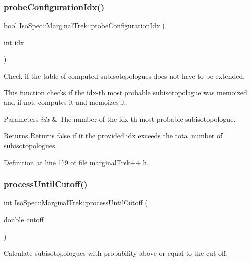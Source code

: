 \subsubsection{\texorpdfstring{probe\+Configuration\+Idx()}{probeConfigurationIdx()}}
{\footnotesize\ttfamily bool Iso\+Spec\+::\+Marginal\+Trek\+::probe\+Configuration\+Idx (\begin{DoxyParamCaption}\item[{int}]{idx }\end{DoxyParamCaption})\hspace{0.3cm}{\ttfamily [inline]}}



Check if the table of computed subisotopologues does not have to be extended. 

This function checks if the idx-\/th most probable subisotopologue was memoized and if not, computes it and memoizes it.


\begin{DoxyParams}{Parameters}
{\em idx} & The number of the idx-\/th most probable subisotopologue. \\
\hline
\end{DoxyParams}
\begin{DoxyReturn}{Returns}
Returns false if it the provided idx exceeds the total number of subisotopologues. 
\end{DoxyReturn}


Definition at line 179 of file marginal\+Trek++.\+h.

\mbox{\label{class_iso_spec_1_1_marginal_trek_a04f3e495a805a3ea242059c963c5b129}} 
\subsubsection{\texorpdfstring{process\+Until\+Cutoff()}{processUntilCutoff()}}
{\footnotesize\ttfamily int Iso\+Spec\+::\+Marginal\+Trek\+::process\+Until\+Cutoff (\begin{DoxyParamCaption}\item[{double}]{cutoff }\end{DoxyParamCaption})}



Calculate subisotopologues with probability above or equal to the cut-\/off. 


